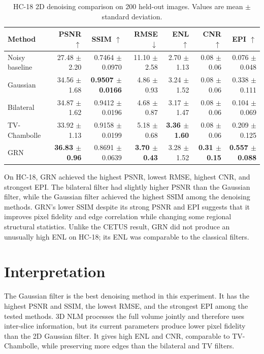 \documentclass[11pt,a4paper]{article}
\begin{document}
\begin{table}[H]
\centering
\caption{HC-18 2D denoising comparison on 200 held-out images. Values are mean $\pm$ standard deviation.}
\label{tab:hc18-results}
\small
\begin{tabular}{lrrrrrr}
\toprule
Method & PSNR $\uparrow$ & SSIM $\uparrow$ & RMSE $\downarrow$ & ENL $\uparrow$ & CNR $\uparrow$ & EPI $\uparrow$ \\
\midrule
Noisy baseline & 27.48 $\pm$ 2.20 & 0.7464 $\pm$ 0.0970 & 11.10 $\pm$ 2.58 & 2.70 $\pm$ 1.13 & 0.08 $\pm$ 0.06 & 0.076 $\pm$ 0.048 \\
Gaussian & 34.56 $\pm$ 1.68 & \textbf{0.9507 $\pm$ 0.0166} & 4.86 $\pm$ 0.93 & 3.24 $\pm$ 1.52 & 0.08 $\pm$ 0.06 & 0.338 $\pm$ 0.111 \\
Bilateral & 34.87 $\pm$ 1.62 & 0.9412 $\pm$ 0.0196 & 4.68 $\pm$ 0.87 & 3.17 $\pm$ 1.47 & 0.08 $\pm$ 0.06 & 0.104 $\pm$ 0.069 \\
TV-Chambolle & 33.92 $\pm$ 1.13 & 0.9158 $\pm$ 0.0199 & 5.18 $\pm$ 0.68 & \textbf{3.36 $\pm$ 1.60} & 0.08 $\pm$ 0.06 & 0.209 $\pm$ 0.125 \\
GRN & \textbf{36.83 $\pm$ 0.96} & 0.8691 $\pm$ 0.0639 & \textbf{3.70 $\pm$ 0.43} & 3.28 $\pm$ 1.52 & \textbf{0.31 $\pm$ 0.15} & \textbf{0.557 $\pm$ 0.088} \\
\bottomrule
\end{tabular}
\end{table}

On HC-18, GRN achieved the highest PSNR, lowest RMSE, highest CNR, and strongest EPI. The bilateral filter had slightly higher PSNR than the Gaussian filter, while the Gaussian filter achieved the highest SSIM among the denoising methods. GRN's lower SSIM despite its strong PSNR and EPI suggests that it improves pixel fidelity and edge correlation while changing some regional structural statistics. Unlike the CETUS result, GRN did not produce an unusually high ENL on HC-18; its ENL was comparable to the classical filters.

\section{Interpretation}
The Gaussian filter is the best denoising method in this experiment. It has the highest PSNR and SSIM, the lowest RMSE, and the strongest EPI among the tested methods. 3D NLM processes the full volume jointly and therefore uses inter-slice information, but its current parameters produce lower pixel fidelity than the 2D Gaussian filter. It gives high ENL and CNR, comparable to TV-Chambolle, while preserving more edges than the bilateral and TV filters.
\end{document}
